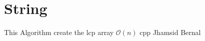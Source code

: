 \section{String}

{This Algorithm create the lcp array}
{$\mathcal{O}(n)$}
{cpp}{}
{Jhamsid Bernal}
